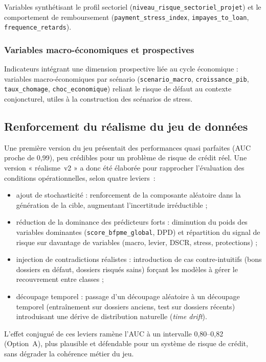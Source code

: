 \documentclass[a4paper,12pt,oneside]{report}
\begin{document}
Variables synthétisant le profil sectoriel (\texttt{niveau\_risque\_sectoriel\_projet}) et le
comportement de remboursement (\texttt{payment\_stress\_index}, \texttt{impayes\_to\_loan},
\texttt{frequence\_retards}).

\subsubsection{Variables macro-économiques et prospectives}

Indicateurs intégrant une dimension prospective liée au cycle économique : variables
macro-économiques par scénario (\texttt{scenario\_macro}, \texttt{croissance\_pib},
\texttt{taux\_chomage}, \texttt{choc\_economique}) reliant le risque de défaut au contexte
conjoncturel, utiles à la construction des scénarios de stress.

\subsection{Renforcement du réalisme du jeu de données}

Une première version du jeu présentait des performances quasi parfaites (AUC proche de
0{,}99), peu crédibles pour un problème de risque de crédit réel. Une version « réalisme~v2 » a
donc été élaborée pour rapprocher l'évaluation des conditions opérationnelles, selon quatre
leviers~:
\begin{itemize}
  \item ajout de stochasticité : renforcement de la composante aléatoire dans la
        génération de la cible, augmentant l'incertitude irréductible ;
  \item réduction de la dominance des prédicteurs forts : diminution du poids des
        variables dominantes (\texttt{score\_bfpme\_global}, DPD) et répartition du signal de
        risque sur davantage de variables (macro, levier, DSCR, stress, protections) ;
  \item injection de contradictions réalistes : introduction de cas contre-intuitifs
        (bons dossiers en défaut, dossiers risqués sains) forçant les modèles à gérer le
        recouvrement entre classes ;
  \item découpage temporel : passage d'un découpage aléatoire à un découpage temporel
        (entraînement sur dossiers anciens, test sur dossiers récents) introduisant une dérive
        de distribution naturelle (\textit{time drift}).
\end{itemize}
L'effet conjugué de ces leviers ramène l'AUC à un intervalle 0{,}80--0{,}82 (Option~A),
plus plausible et défendable pour un système de risque de crédit, sans dégrader la cohérence
métier du jeu.
\end{document}
